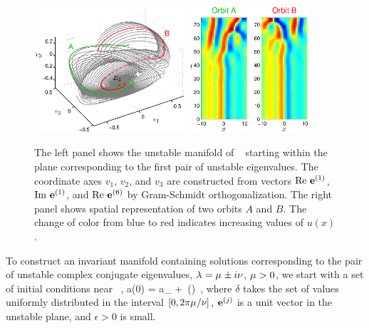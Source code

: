 \begin{figure}[t]
\begin{center}
\includegraphics[width=0.5\textwidth]{figs/ks22_E1_plane1_manifold_c.eps}
\includegraphics[width=0.4\textwidth]{figs/ks22_E1_plane1_orbits_c.eps}
\end{center}
\caption{
The left panel shows the unstable
manifold of \eqv\  starting within the plane
corresponding to the first pair of unstable eigenvalues. The
coordinate axes $v_1$, $v_2$, and $v_3$ are constructed from vectors
${\rm Re\,} \,{\mathbf e}^{(1)}$, ${\rm Im\,} \,{\mathbf e}^{(1)}$,
and ${\rm Re\,} \,{\mathbf e}^{(6)}$
by Gram-Schmidt orthogonalization.
The right panel shows spatial representation of two orbits $A$ and $B$.
The change of color from blue to red indicates increasing values of
$u(x)$.
}
\label{f:KS22E1man1}
\end{figure}

To construct an invariant manifold containing solutions
corresponding to the pair of unstable complex conjugate eigenvalues,
$\lambda_{ } = \mu_{ } \pm i\nu_{ }$,
$\mu_{ } > 0$, we start with a set of
initial conditions near \eqv\ ,
\beq
  a(0) = a_{{}} + \epsilon\,\exp(\delta)
\,,
where $\delta$ takes the set of values uniformly distributed in the
interval $[0,2\pi\mu_{ }/\nu_{ }]$, ${\mathbf e}^{(j)}$ is a unit vector in the
unstable plane, and $\epsilon > 0$ is small.

